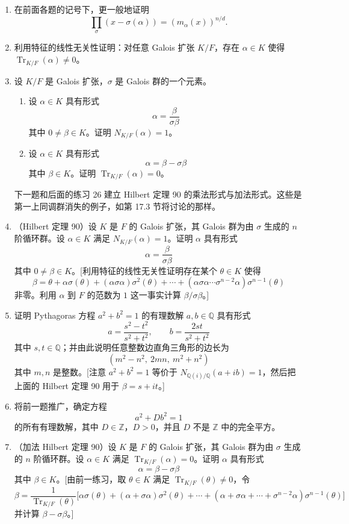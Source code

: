 \begin{enumerate}[label=\arabic*.]
\item 在前面各题的记号下，更一般地证明
\[
\prod_\sigma (x-\sigma(\alpha))=(m_\alpha(x))^{n/d}.
\]

\item 利用特征的线性无关性证明：对任意 Galois 扩张 $K/F$，存在 $\alpha\in K$ 使得 $\operatorname{Tr}_{K/F}(\alpha)\neq0$。

\item 设 $K/F$ 是 Galois 扩张，$\sigma$ 是 Galois 群的一个元素。
\begin{enumerate}[label=(\alph*)]
\item 设 $\alpha\in K$ 具有形式
\[
\alpha=\frac{\beta}{\sigma\beta}
\]
其中 $0\neq\beta\in K$。证明 $N_{K/F}(\alpha)=1$。
\item 设 $\alpha\in K$ 具有形式
\[
\alpha=\beta-\sigma\beta
\]
其中 $\beta\in K$。证明 $\operatorname{Tr}_{K/F}(\alpha)=0$。
\end{enumerate}

下一题和后面的练习 26 建立 Hilbert 定理 90 的乘法形式与加法形式。这些是第一上同调群消失的例子，如第 17.3 节将讨论的那样。

\item （Hilbert 定理 90）设 $K$ 是 $F$ 的 Galois 扩张，其 Galois 群为由 $\sigma$ 生成的 $n$ 阶循环群。设 $\alpha\in K$ 满足 $N_{K/F}(\alpha)=1$。证明 $\alpha$ 具有形式
\[
\alpha=\frac{\beta}{\sigma\beta}
\]
其中 $0\neq\beta\in K$。[利用特征的线性无关性证明存在某个 $\theta\in K$ 使得
\[
\beta=\theta+\alpha\sigma(\theta)+(\alpha\sigma\alpha)\sigma^2(\theta)+\cdots+(
\alpha\sigma\alpha\cdots\sigma^{n-2}\alpha)\sigma^{n-1}(\theta)
\]
非零。利用 $\alpha$ 到 $F$ 的范数为 $1$ 这一事实计算 $\beta/\sigma\beta$。]

\item 证明 Pythagoras 方程 $a^2+b^2=1$ 的有理数解 $a,b\in\mathbb Q$ 具有形式
\[
a=\frac{s^2-t^2}{s^2+t^2},
\qquad
b=\frac{2st}{s^2+t^2}
\]
其中 $s,t\in\mathbb Q$；并由此说明任意整数边直角三角形的边长为
\[
(m^2-n^2,\ 2mn,\ m^2+n^2)
\]
其中 $m,n$ 是整数。[注意 $a^2+b^2=1$ 等价于 $N_{\mathbb Q(i)/\mathbb Q}(a+ib)=1$，然后把上面的 Hilbert 定理 90 用于 $\beta=s+it$。]

\item 将前一题推广，确定方程
\[
a^2+Db^2=1
\]
的所有有理数解，其中 $D\in\mathbb Z$，$D>0$，并且 $D$ 不是 $\mathbb Z$ 中的完全平方。

\item （加法 Hilbert 定理 90）设 $K$ 是 $F$ 的 Galois 扩张，其 Galois 群为由 $\sigma$ 生成的 $n$ 阶循环群。设 $\alpha\in K$ 满足 $\operatorname{Tr}_{K/F}(\alpha)=0$。证明 $\alpha$ 具有形式
\[
\alpha=\beta-\sigma\beta
\]
其中 $\beta\in K$。[由前一练习，取 $\theta\in K$ 满足 $\operatorname{Tr}_{K/F}(\theta)\neq0$，令
\[
\beta=\frac{1}{\operatorname{Tr}_{K/F}(\theta)}
\bigl[\alpha\sigma(\theta)+(\alpha+\sigma\alpha)\sigma^2(\theta)+\cdots+
(\alpha+\sigma\alpha+\cdots+\sigma^{n-2}\alpha)\sigma^{n-1}(\theta)\bigr]
\]
并计算 $\beta-\sigma\beta$。]


\end{enumerate}
